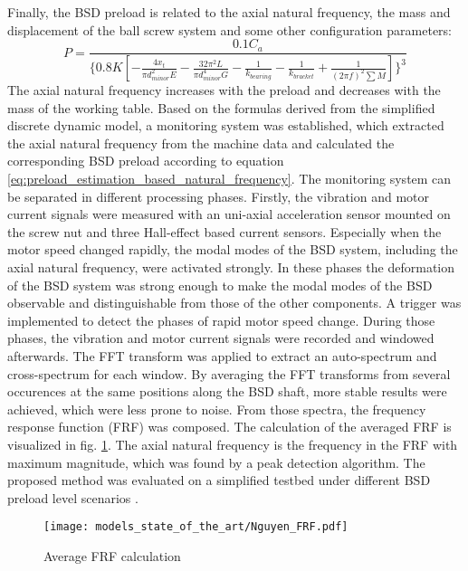 Finally, the BSD preload is related to the axial natural frequency, the mass and displacement of the ball screw system and some other configuration parameters:
\begin{equation}
    P=\frac{0.1C_{a}}{\{0.8K[ -\frac{4x_{t}}{\pi d_{minor}^{2}E} -\frac{32\pi^{2}L}{\pi d_{minor}^{4}G}-\frac{1}{k_{bearing}}-\frac{1}{k_{bracket}}+\frac{1}{(2\pi f)^{2}\sum M} ]\}^{3}}
\label{eq:preload_estimation_based_natural_frequency}
\end{equation}
The axial natural frequency increases with the preload and decreases with the mass of the working table. Based on the formulas derived from the simplified discrete dynamic model, a monitoring system was established, which extracted the axial natural frequency from the machine data and calculated the corresponding BSD preload according to equation \ref{eq:preload_estimation_based_natural_frequency}. The monitoring system can be separated in different processing phases. Firstly, the vibration and motor current signals were measured with an uni-axial acceleration sensor mounted on the screw nut and three Hall-effect based current sensors. Especially when the motor speed changed rapidly, the modal modes of the BSD system, including the axial natural frequency, were activated strongly. In these phases the deformation of the BSD system was strong enough to make the modal modes of the BSD observable and distinguishable from those of the other components. A trigger was implemented to detect the phases of rapid motor speed change. During those phases, the vibration and motor current signals were recorded and windowed afterwards. The FFT transform was applied to extract an auto-spectrum and cross-spectrum for each window. By averaging the FFT transforms from several occurences at the same positions along the BSD shaft, more stable results were achieved, which were less prone to noise. From those spectra, the frequency response function (FRF) was composed. The calculation of the averaged FRF is visualized in fig. \ref{fig:Nguyen_frf}. The axial natural frequency is the frequency in the FRF with maximum magnitude, which was found by a peak detection algorithm. The proposed method was evaluated on a simplified testbed under different BSD preload level scenarios \cite{NGUYEN2019}.

\begin{figure}[H]
  \centering
  \texttt{[image: models\_state\_of\_the\_art/Nguyen\_FRF.pdf]}
  \caption{Average FRF calculation \cite{NGUYEN2019}}
  \label{fig:Nguyen_frf}
\end{figure}


